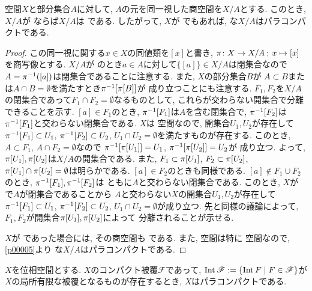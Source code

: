 \documentclass[uplatex, dvipdfmx, a4paper, 12pt, class=jsbook, crop=false]{standalone}
\begin{document}
\begin{proposition}
	 空間$ X $と部分集合$ A $に対して, $ A $の元を同一視した商空間を$ X / A $とする.
	このとき, $ X / A $が  ならば$ X / A $は  である.
	したがって, $ X $が \Lindelof でもあれば, な$ X / A $はパラコンパクトである.
\end{proposition}

\begin{proof}
	この同一視に関する$ x \in X $の同値類を$ [x] $と書き, $ \pi\colon X\to X / A\mathpunct{\: ; \:} x\mapsto[x] $を商写像とする.
	$ X / A $が  のとき$ a \in A $に対して$ \{[a]\} \in X / A $は閉集合なので
	$ A = \mapinvpt{\pi}{[a]} $は閉集合であることに注意する. また, $ X $の部分集合$ B $が
	$ A \subset B $または$ A \cap B = \emptyset $を満たすとき$ \mapinvset{\pi}{\mapset{\pi}{B}} $が
	成り立つことにも注意する.
	$ F_1, F_2 $を$ X / A $の閉集合であって$ F_1 \cap F_2 = \emptyset $なるものとして,
	これらが交わらない開集合で分離できることを示す.
	$ [a] \in F_1 $のとき, $ \mapinvset{\pi}{F_1} $は$ A $を含む閉集合で, $ \mapinvset{\pi}{F_2} $は
	$ \mapinvset{\pi}{F_1} $と交わらない閉集合である.
	$ X $は  空間なので, 開集合$ U_1, U_2 $が存在して$ \mapinvset{\pi}{F_1} \subset U_1 $,
	$ \mapinvset{\pi}{F_2} \subset U_2 $, $ U_1 \cap U_2 = \emptyset $を満たすものが存在する.
	このとき, $ A \subset F_1 $, $ A \cap F_2 = \emptyset $なので
	$ \mapinvset{\pi}{\mapset{\pi}{U_1}} = U_1 $, $ \mapinvset{\pi}{\mapset{\pi}{U_2}} = U_2 $が
	成り立つ. よって, $ \mapset{\pi}{U_1}, \mapset{\pi}{U_2} $は$ X / A $の開集合である.
	また, $ F_1 \subset \mapset{\pi}{U_1} $, $ F_2 \subset \mapset{\pi}{U_2} $,
	$ \mapset{\pi}{U_1} \cap \mapset{\pi}{U_2} = \emptyset $は明らかである.
	$ [a] \in F_2 $のときも同様である.
	$ [a] \notin F_1 \cup F_2 $のとき, $ \mapinvset{\pi}{F_1}, \mapinvset{\pi}{F_2} $は
	ともに$ A $と交わらない閉集合である.
	このとき, $ X $が  で$ A $が閉集合であることから
	$ A $と交わらない$ X $の開集合$ U_1, U_2 $が存在して
	$ \mapinvset{\pi}{F_1} \subset U_1 $, $ \mapinvset{\pi}{F_2} \subset U_2 $,
	$ U_1 \cap U_2 = \emptyset $が成り立つ.
	先と同様の議論によって, $ F_1, F_2 $が開集合$ \mapset{\pi}{U_1}, \mapset{\pi}{U_2} $によって
	分離されることが示せる.

	$ X $が \Lindelof であった場合には, その商空間も \Lindelof である.
	また,  空間は特に  空間なので, \cref{p00005}より
	 な$ X / A $はパラコンパクトである.
\end{proof}

\begin{proposition}
	\label{prop:existence of a compact covering whose interior is a locally finite covering>ParaCpt}
	$ X $を位相空間とする. $ X $のコンパクト被覆$\mathscr{F}$であって,
	$\topint \mathscr{F} \defeq \setcomp{\topint F}{F \in \mathscr{F}}$が$X$の局所有限な被覆となるものが存在するとき,
	$ X $はパラコンパクトである.
\end{proposition}
\end{document}
